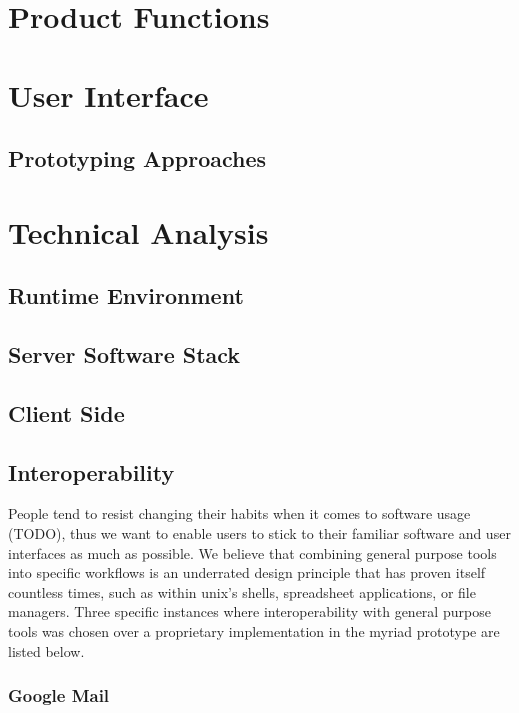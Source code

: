 \section{Product Functions}


\section{User Interface}


\subsection{Prototyping Approaches}


\section{Technical Analysis}

\subsection{Runtime Environment}

\subsection{Server Software Stack}

\subsection{Client Side}

\subsection{Interoperability}

People tend to resist changing their habits when it comes to software usage (TODO), thus we want to enable users to stick to their familiar software and user interfaces as much as possible. We believe that combining general purpose tools into specific workflows is an underrated design principle that has proven itself countless times, such as within unix’s shells, spreadsheet applications, or file managers.
Three specific instances where interoperability with general purpose tools was chosen over a proprietary implementation in the myriad prototype are listed below.

\subsubsection{Google Mail}

